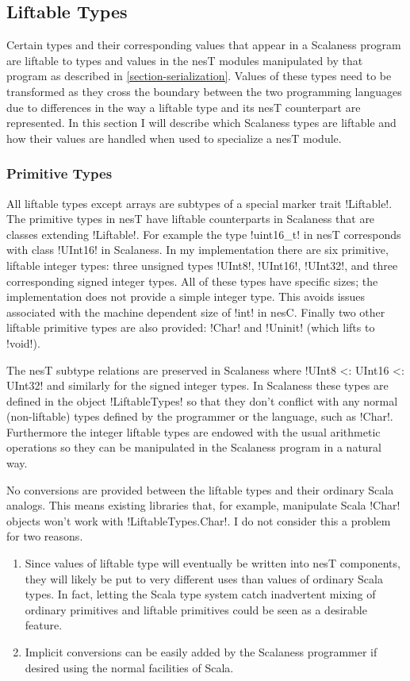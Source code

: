 \subsection{Liftable Types}
\label{section-liftable-types}

Certain types and their corresponding values that appear in a Scalaness program are liftable to
types and values in the nesT modules manipulated by that program as described in
\autoref{section-serialization}. Values of these types need to be transformed as they cross the
boundary between the two programming languages due to differences in the way a liftable type and
its nesT counterpart are represented. In this section I will describe which Scalaness types are
liftable and how their values are handled when used to specialize a nesT module.

\subsubsection{Primitive Types}
\label{section-liftable-primitives}

All liftable types except arrays are subtypes of a special marker trait !Liftable!. The
primitive types in nesT have liftable counterparts in Scalaness that are classes extending
!Liftable!. For example the type !uint16_t! in nesT corresponds with class !UInt16! in
Scalaness. In my implementation there are six primitive, liftable integer types: three unsigned
types !UInt8!, !UInt16!, !UInt32!, and three corresponding signed integer types. All of these
types have specific sizes; the implementation does not provide a simple integer type. This
avoids issues associated with the machine dependent size of !int! in nesC. Finally two other
liftable primitive types are also provided: !Char! and !Uninit! (which lifts to !void!).

The nesT subtype relations are preserved in Scalaness where !UInt8 <: UInt16 <: UInt32! and
similarly for the signed integer types. In Scalaness these types are defined in the object
!LiftableTypes! so that they don't conflict with any normal (non-liftable) types defined by the
programmer or the language, such as !Char!. Furthermore the integer liftable types are endowed
with the usual arithmetic operations so they can be manipulated in the Scalaness program in a
natural way.

No conversions are provided between the liftable types and their ordinary Scala analogs. This
means existing libraries that, for example, manipulate Scala !Char! objects won't work with
!LiftableTypes.Char!. I do not consider this a problem for two reasons.
\begin{enumerate}
\item Since values of liftable type will eventually be written into nesT components, they will
  likely be put to very different uses than values of ordinary Scala types. In fact, letting the
  Scala type system catch inadvertent mixing of ordinary primitives and liftable primitives
  could be seen as a desirable feature.
\item Implicit conversions can be easily added by the Scalaness programmer if desired using the
  normal facilities of Scala.
\end{enumerate}

